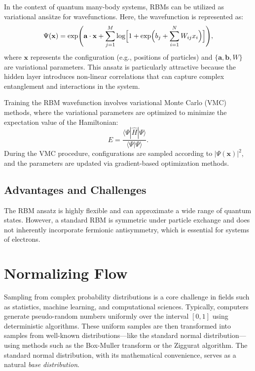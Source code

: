 In the context of quantum many-body systems, RBMs can be utilized as variational ans\"atze for wavefunctions. Here, the wavefunction is represented as:
\begin{equation}
    \Psi(\mathbf{x}) = \exp\Biggl( \mathbf{a}\cdot\mathbf{x} + \sum_{j=1}^{M} \log\Bigl[1+\exp\Bigl(b_j + \sum_{i=1}^{N} W_{ij} x_i\Bigr)\Bigr] \Biggr),
\end{equation}
where $\mathbf{x}$ represents the configuration (e.g., positions of particles) and $\{ \mathbf{a}, \mathbf{b}, W \}$ are variational parameters. This ansatz is particularly attractive because the hidden layer introduces non-linear correlations that can capture complex entanglement and interactions in the system.

Training the RBM wavefunction involves variational Monte Carlo (VMC) methods, where the variational parameters are optimized to minimize the expectation value of the Hamiltonian:
\begin{equation}
    E = \frac{\langle \Psi | \hat{H} | \Psi \rangle}{\langle \Psi | \Psi \rangle}.
\end{equation}
During the VMC procedure, configurations are sampled according to $|\Psi(\mathbf{x})|^2$, and the parameters are updated via gradient-based optimization methods.

\subsection{Advantages and Challenges}

The RBM ansatz is highly flexible and can approximate a wide range of quantum states. However, a standard RBM is symmetric under particle exchange and does not inherently incorporate fermionic antisymmetry, which is essential for systems of electrons. 




\section{Normalizing Flow}
Sampling from complex probability distributions is a core challenge in fields such as statistics, machine learning, and computational sciences. Typically, computers generate pseudo-random numbers uniformly over the interval \([0,1]\) using deterministic algorithms. These uniform samples are then transformed into samples from well-known distributions—like the standard normal distribution—using methods such as the Box-Muller transform or the Ziggurat algorithm. The standard normal distribution, with its mathematical convenience, serves as a natural \emph{base distribution}.

